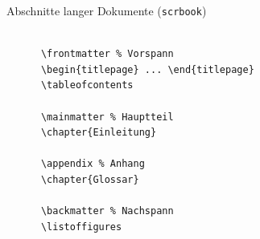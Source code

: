 \begin{Frame}[fragile]{Abschnitte langer Dokumente (\lstinline-scrbook-)}
  \begin{lstlisting}[gobble=4]
    
      \frontmatter % Vorspann
      \begin{titlepage} ... \end{titlepage}
      \tableofcontents

      \mainmatter % Hauptteil
      \chapter{Einleitung}

      \appendix % Anhang
      \chapter{Glossar}
      
      \backmatter % Nachspann
      \listoffigures
    
  \end{lstlisting}
\end{Frame}

